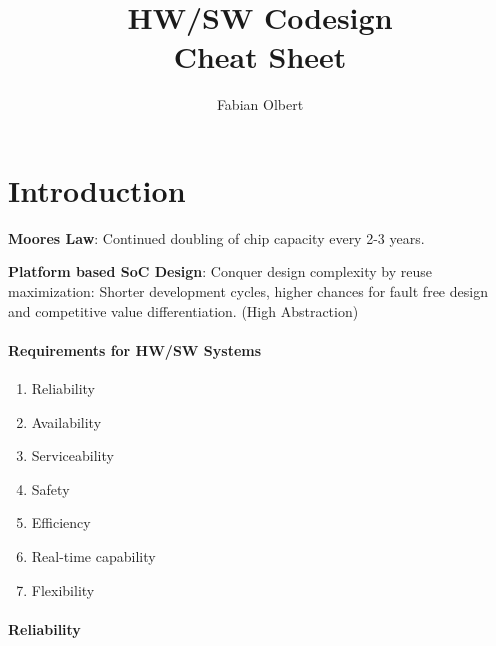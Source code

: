 \documentclass[english]{latex4ei/latex4ei_sheet}
\title{HW/SW Codesign \\ Cheat Sheet}
\author{Fabian Olbert}                    %
\begin{document}
\maketitle   %

\section{Introduction}

\textbf{Moores Law}: Continued doubling of chip capacity every 2-3 years.

\textbf{Platform based SoC Design}: Conquer design complexity by reuse maximization: Shorter development cycles, higher chances for fault free design and competitive value differentiation. (High Abstraction)

\paragraph{Requirements for HW/SW Systems}
\begin{enumerate}
	\item Reliability
	\item Availability
	\item Serviceability
	\item Safety
	\item Efficiency
	\item Real-time capability
	\item Flexibility
\end{enumerate}

\paragraph{Reliability}
\end{document}
